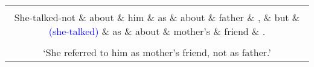\documentclass{standalone}  %
\begin{document}
\begin{tabular}{c}
\begin{dependency}[edge unit distance=3ex]
  \begin{deptext}
    Nemluvila \& o \& něm \& jako \& o \& otci \& , \& ale \& \textcolor{blue}{(mluvila)} \& jako \& o \& matčinu \& příteli \& . \\
    She-talked-not \& about \& him \& as \& about \& father \& , \& but \& \textcolor{blue}{(she-talked)} \& as \& about \& mother's \& friend \& . \\
  \end{deptext}
  \depedge[edge unit distance=1.62ex]{1}{14}{punct}
  \depedge[edge unit distance=1.8ex]{1}{6}{advcl}
  \depedge{1}{3}{obl:arg}
  \depedge{3}{2}{case}
  \depedge{6}{4}{mark}
  \depedge{6}{5}{case}
  \depedge[red,label style={red,fill=white,text=red},edge unit distance=2.57ex]{6}{13}{conj}
  \depedge[red,label style={red,fill=white,text=red},edge unit distance=2.5ex]{13}{7}{punct}
  \depedge[red,label style={red,fill=white,text=red},edge unit distance=2.4ex]{13}{8}{cc}
  \depedge{13}{10}{mark}
  \depedge{13}{11}{case}
  \depedge{13}{12}{amod}
  \deproot[edge unit distance=6ex]{1}{root}
  \depedge[edge below,edge unit distance=1.85ex]{1}{14}{punct}
  \depedge[edge below,blue,label style={blue,fill=white,text=blue},edge unit distance=2.62ex]{1}{9}{conj}
  \depedge[edge below]{1}{3}{obl:arg:o:loc}
  \depedge[edge below]{3}{2}{case}
  \depedge[edge below]{6}{4}{mark}
  \depedge[edge below]{6}{5}{case}
  \depedge[edge below,blue,label style={blue,fill=white,text=blue}]{9}{7}{punct}
  \depedge[edge below,blue,label style={blue,fill=white,text=blue}]{9}{8}{cc}
  \depedge[edge below,blue,label style={blue,fill=white,text=blue}]{9}{13}{advcl:jako}
  \deproot[edge below,draw=blue,fill=white,text=blue,label style={fill=white,text=blue},edge unit distance=6.75ex]{9}{root}
  \depedge[edge below,blue,label style={blue,fill=white,text=blue},edge unit distance=1.8ex]{13}{3}{nsubj:xsubj}
  \depedge[edge below]{1}{6}{advcl:jako}
  \depedge[edge below,blue,label style={blue,fill=white,text=blue},edge unit distance=2ex]{9}{3}{obl:arg:o:loc}
  \depedge[edge below,blue,label style={blue,fill=white,text=blue}]{6}{3}{nsubj:xsubj}
  \depedge[edge below]{13}{10}{mark}
  \depedge[edge below]{13}{11}{case}
  \depedge[edge below]{13}{12}{amod}
  \deproot[edge below,edge unit distance=6.75ex]{1}{root}
\end{dependency} \\
`She referred to him as mother's friend, not as father.' \\
\end{tabular}
\end{document}
